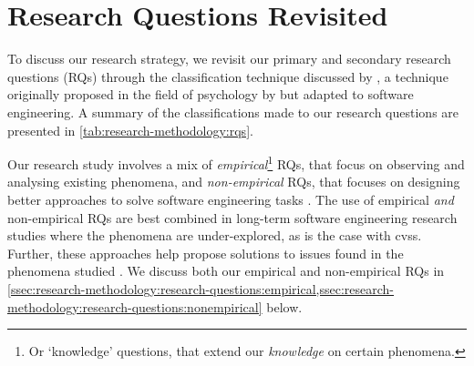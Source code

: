\section{Research Questions Revisited}
\label{sec:research-methodology:research-questions}


\newcontent
To discuss our research strategy, we revisit our \NumPrimaryRQs{} primary and \NumSecondaryRQs{} secondary research questions (RQs) through the classification technique discussed by \citet{Easterbrook:2007ws}, a technique originally proposed in the field of psychology by \citet{Meltzoff:1998wg} but adapted to software engineering. A summary of the classifications made to our research questions are presented in \cref{tab:research-methodology:rqs}.

Our research study involves a mix of \NumEmpiricalRQs{} \textit{empirical}\footnote{Or `knowledge' questions, that extend our \textit{knowledge} on certain phenomena.} RQs, that focus on observing and analysing existing phenomena, and \NumNonEmpiricalRQs{} \textit{non-empirical} RQs, that focuses on designing better approaches to solve software engineering tasks \citep{Simon:1996uw}. The use of empirical \textit{and} non-empirical RQs are best combined in long-term software engineering research studies where the phenomena are under-explored, as is the case with \glspl{cvs}. Further, these approaches help propose solutions to issues found in the phenomena studied \citep{Wieringa:2006vd}. We discuss both our empirical and non-empirical RQs in \cref{ssec:research-methodology:research-questions:empirical,ssec:research-methodology:research-questions:nonempirical} below. 

